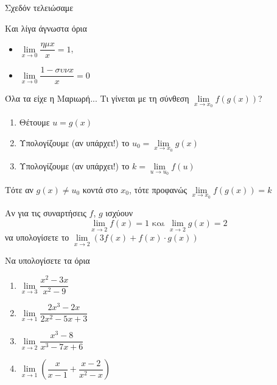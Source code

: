 \documentclass{presentation}
\begin{document}
\begin{frame}{Σχεδόν τελειώσαμε}
  \begin{block}{Και λίγα άγνωστα όρια}
    \begin{itemize}
      \item $\lim\limits_{x \to 0}{ \dfrac{ημx}{x} }=1$, \pause
      \item $\lim\limits_{x \to 0}{ \dfrac{1-συνx}{x} }=0$
    \end{itemize}
  \end{block}
\end{frame}

\begin{frame}{Όλα τα είχε η Μαριωρή...}
  Τι γίνεται με τη σύνθεση  $\lim\limits_{x \to x_0}{ f(g(x))}$?
  \begin{enumerate}
    \item<1-> Θέτουμε $u=g(x)$
    \item<2-> Υπολογίζουμε (αν υπάρχει!) το $u_0=\lim\limits_{x \to x_0}{ g(x)}$
    \item<3-> Υπολογίζουμε (αν υπάρχει!) το $k=\lim\limits_{u \to u_0}{ f(u)}$
  \end{enumerate}
  Τότε αν $g(x)\ne u_0$ κοντά στο $x_0$, τότε προφανώς $\lim\limits_{x \to x_0}{ f(g(x))}=k$
\end{frame}


\exercises

\begin{askisi}
  Αν για τις συναρτήσεις $f$, $g$ ισχύουν
  $$\lim\limits_{x \to 2}{ f(x) }=1 \text{ και } \lim\limits_{ x \to 2}{ g(x) }=2$$
  να υπολογίσετε το $\lim\limits_{x \to 2}{ \left( 3f(x)+f(x)\cdot g(x) \right) }$

\end{askisi}

\begin{askisi}
  Να υπολογίσετε τα όρια
  \begin{enumerate}
    \item $\lim\limits_{x \to 3}{ \dfrac{x^2-3x}{x^2-9} }$ \pause
    \item $\lim\limits_{x \to 1}{ \dfrac{2x^3-2x}{2x^2-5x+3} }$ \pause
    \item $\lim\limits_{x \to 2}{ \dfrac{x^3-8}{x^3-7x+6} }$ \pause
    \item $\lim\limits_{x \to 1}{ \left( \dfrac{x}{x-1}+\dfrac{x-2}{x^2-x}  \right)  }$
  \end{enumerate}
\end{askisi}
\end{document}
